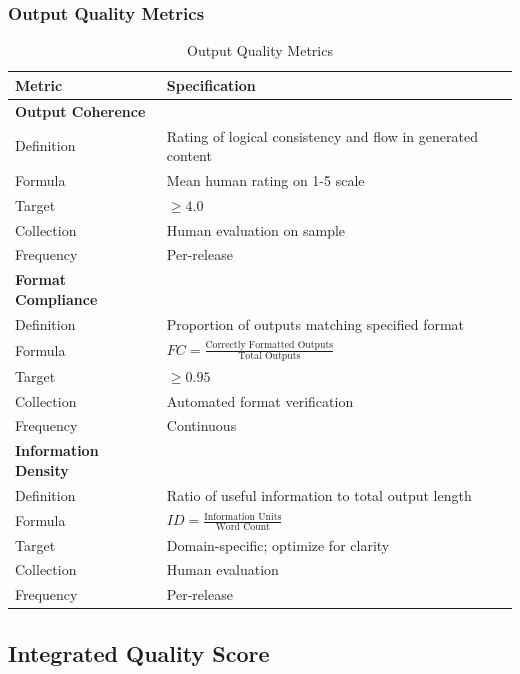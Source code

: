 \subsubsection{Output Quality Metrics}

\begin{table}[!htbp]
\centering
\caption{Output Quality Metrics}
\label{tab:output_quality_metrics}
\small
\begin{tabularx}{\linewidth}{@{}l X@{}}
\toprule
\textbf{Metric} & \textbf{Specification} \\
\midrule
\textbf{Output Coherence} & \\
Definition & Rating of logical consistency and flow in generated content \\
Formula & Mean human rating on 1-5 scale \\
Target & $\geq 4.0$ \\
Collection & Human evaluation on sample \\
Frequency & Per-release \\
\addlinespace

\textbf{Format Compliance} & \\
Definition & Proportion of outputs matching specified format \\
Formula & $FC = \frac{\text{Correctly Formatted Outputs}}{\text{Total Outputs}}$ \\
Target & $\geq 0.95$ \\
Collection & Automated format verification \\
Frequency & Continuous \\
\addlinespace

\textbf{Information Density} & \\
Definition & Ratio of useful information to total output length \\
Formula & $ID = \frac{\text{Information Units}}{\text{Word Count}}$ \\
Target & Domain-specific; optimize for clarity \\
Collection & Human evaluation \\
Frequency & Per-release \\
\bottomrule
\end{tabularx}
\end{table}

\subsection{Integrated Quality Score}

